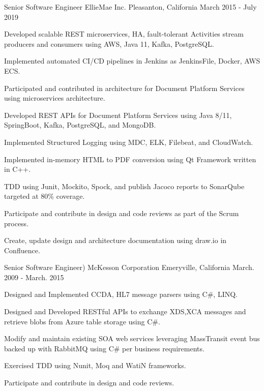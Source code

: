\begin{cventries}
  \cventry
    {Senior Software Engineer} %
    {EllieMae Inc.} %
    {Pleasanton, California} %
    {March 2015 - July 2019} %
    {
      \begin{cvitems} %
        \item {Developed scalable REST microservices, HA, fault-tolerant Activities stream producers and consumers using AWS, Java 11, Kafka, PostgreSQL.}
        \item {Implemented automated CI/CD pipelines in Jenkins as JenkinsFile, Docker, AWS ECS.}
        \item {Participated and contributed in architecture for Document Platform Services using microservices architecture.}
        \item {Developed REST APIs for Document Platform Services using Java 8/11, SpringBoot, Kafka, PostgreSQL, and MongoDB.}
        \item {Implemented Structured Logging using MDC, ELK, Filebeat, and CloudWatch.}
        \item {Implemented in-memory HTML to PDF conversion using Qt Framework written in C++.}
        \item {TDD using Junit, Mockito, Spock, and publish Jacoco reports to SonarQube targeted at 80\% coverage.}
        \item {Participate and contribute in design and code reviews as part of the Scrum process.}
        \item {Create, update design and architecture documentation using draw.io in Confluence.}
      \end{cvitems}
    }

  \cventry
    {Senior Software Engineer)} %
    {McKesson Corporation} %
    {Emeryville, California} %
    {March. 2009 - March. 2015} %
    {
      \begin{cvitems} %
        \item {Designed and Implemented CCDA, HL7 message parsers using C\#, LINQ.}
        \item {Designed and Developed RESTful APIs to exchange XDS,XCA messages and retrieve blobs from Azure table storage using C\#.}
        \item {Modify and maintain existing SOA web services leveraging MassTransit event bus backed up with RabbitMQ using C\# per business requirements.}
         \item {Exercised TDD using Nunit, Moq and WatiN frameworks. }
        \item {Participate and contribute in design and code reviews.}
      \end{cvitems}
    }


\end{cventries}
